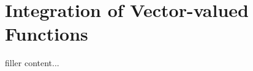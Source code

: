\documentclass[../../templates/section]{subfiles}
\begin{document}
\section{Integration of Vector-valued Functions}\label{sec:integration-of-vector-valued-functions}

filler content...
\end{document}
